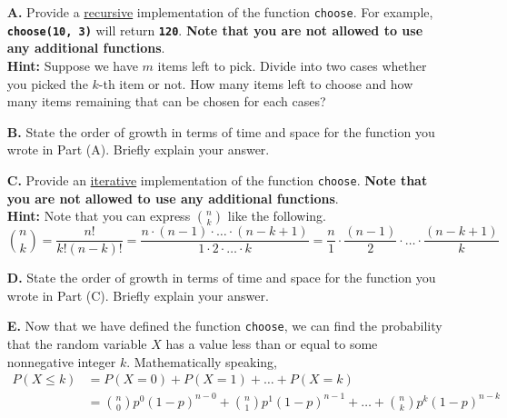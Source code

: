 \begin{enumerate}
\item[\textbf{A.}]
Provide a \underline{recursive} implementation of the function \colorbox{CornflowerBlue!20}{\texttt{choose}}. For example, 
\texttt{\bfseries choose(10, 3)} will return \texttt{\bfseries 120}. \textbf{Note that you are not allowed to use any additional functions}.\\
\textbf{Hint:} Suppose we have $m$ items left to pick. Divide into two cases whether you picked the $k$-th item or not. How many items left to 
choose and how many items remaining that can be chosen for each cases?
\begin{flushright}
    [4 marks]
\end{flushright}
\item[\textbf{B.}]
State the order of growth in terms of time and space for the function you wrote in Part (A). Briefly explain your answer.
\begin{flushright}
    [3 marks]
\end{flushright}
\item[\textbf{C.}]
Provide an \underline{iterative} implementation of the function \colorbox{CornflowerBlue!20}{\texttt{choose}}. \textbf{Note that you are not 
allowed to use any additional functions}.\\
\textbf{Hint:} Note that you can express $\binom{n}{k}$ like the following.
\[\binom{n}{k} = \frac{n!}{k!(n-k)!} = \frac{n \cdot (n-1) \cdot \ldots \cdot (n-k+1)}{1 \cdot 2 \cdot \ldots \cdot k} = \frac{n}{1} \cdot 
\frac{(n-1)}{2} \cdot \ldots \cdot \frac{(n-k+1)}{k}\]
\begin{flushright}
    [4 marks]
\end{flushright}
\item[\textbf{D.}]
State the order of growth in terms of time and space for the function you wrote in Part (C). Briefly explain your answer.
\begin{flushright}
    [2 marks]
\end{flushright}
\item[\textbf{E.}]
Now that we have defined the function \colorbox{CornflowerBlue!20}{\texttt{choose}}, we can find the probability that the random variable $X$ has 
a value less than or equal to some nonnegative integer $k$. Mathematically speaking,
\begin{align*}
    P(X \le k) &= P(X = 0) + P(X = 1) + \ldots + P(X = k) \\
    &= \binom{n}{0}p^0(1-p)^{n-0} + \binom{n}{1}p^1(1-p)^{n-1} + \ldots + \binom{n}{k}p^k(1-p)^{n-k}

\end{align*}
\end{enumerate}
